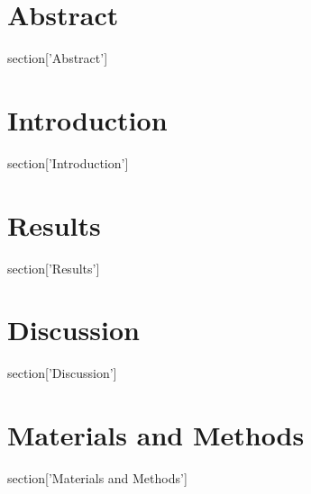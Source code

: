 \documentclass[10pt]{article}
\date{}
\begin{document}

\section*{Abstract}
{{ section['Abstract'] }}


\section*{Introduction}
{{ section['Introduction'] }}

\section*{Results}
{{ section['Results'] }}


\section*{Discussion}
{{ section['Discussion'] }}

\section*{Materials and Methods}
{{ section['Materials and Methods'] }}
\end{document}
